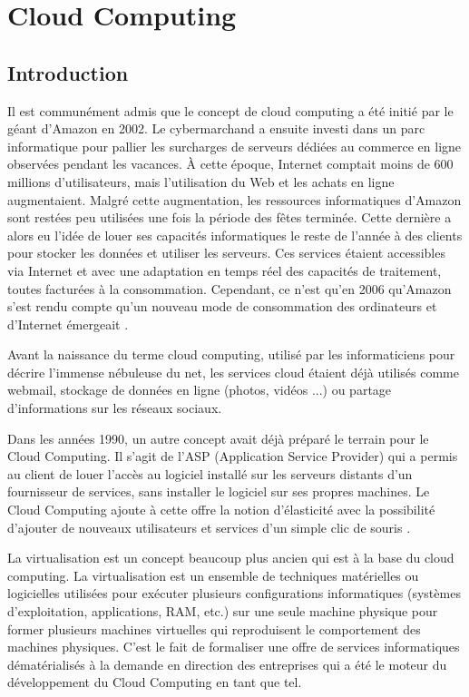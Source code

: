 \chapter{Cloud Computing}

\section{Introduction}
Il est communément admis que le concept de cloud computing a été initié par le géant d'Amazon en 2002. Le cybermarchand a ensuite investi dans un parc informatique pour pallier les surcharges de serveurs dédiées au commerce en ligne observées pendant les vacances. À cette époque, Internet comptait moins de 600 millions d'utilisateurs, mais l'utilisation du Web et les achats en ligne augmentaient. Malgré cette augmentation, les ressources informatiques d'Amazon sont restées peu utilisées une fois la période des fêtes terminée. Cette dernière a alors eu l'idée de louer ses capacités informatiques le reste de l'année à des clients pour stocker les données et utiliser les serveurs. Ces services étaient accessibles via Internet et avec une adaptation en temps réel des capacités de traitement, toutes facturées à la consommation. Cependant, ce n'est qu'en 2006 qu'Amazon s'est rendu compte qu'un nouveau mode de consommation des ordinateurs et d'Internet émergeait \cite{c1}.


Avant la naissance du terme cloud computing, utilisé par les informaticiens pour décrire l'immense nébuleuse du net, les services cloud étaient déjà utilisés comme webmail, stockage de données en ligne (photos, vidéos ...) ou partage d'informations sur les réseaux sociaux.


Dans les années 1990, un autre concept avait déjà préparé le terrain pour le Cloud Computing. Il s'agit de l'ASP (Application Service Provider) qui a permis au client de louer l'accès au logiciel installé sur les serveurs distants d'un fournisseur de services, sans installer le logiciel sur ses propres machines. Le Cloud Computing ajoute à cette offre la notion d'élasticité avec la possibilité d'ajouter de nouveaux utilisateurs et services d'un simple clic de souris \cite{c1}.


La virtualisation est un concept beaucoup plus ancien qui est à la base du cloud computing. La virtualisation est un ensemble de techniques matérielles ou logicielles utilisées pour exécuter plusieurs configurations informatiques (systèmes d'exploitation, applications, RAM, etc.) sur une seule machine physique pour former plusieurs machines virtuelles qui reproduisent le comportement des machines physiques. C'est le fait de formaliser une offre de services informatiques dématérialisés à la demande en direction des entreprises qui a été le moteur du développement du Cloud Computing en tant que tel.
